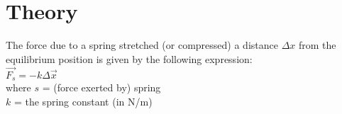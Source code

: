\chapter{Theory}

The force due to a spring stretched (or compressed) a distance $\Delta x$ from the 
equilibrium position is given by the following expression:\\

$\vec{F_s} = -k\Delta \vec{x}$\\

\noindent where $s$ = (force exerted by) spring\\
\indent\indent $k$ = the spring constant (in N/m)\\
